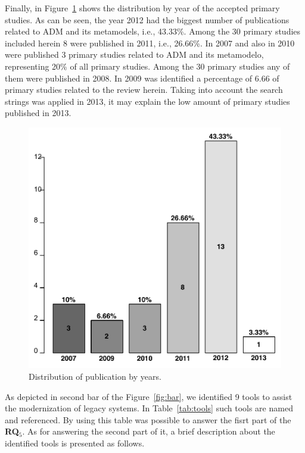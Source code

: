 Finally, in Figure~\ref{fig:distribuicao_de_artigo_por_ano} shows the distribution by year of the accepted primary studies. As can be seen, the year 2012 had the biggest number of publications related to ADM and its metamodels, i.e., 43.33\%. Among the 30 primary studies included herein 8 were published in 2011, i.e., 26.66\%. In 2007 and also in 2010 were published 3 primary studies related to ADM and its metamodelo, representing 20\% of all primary studies. Among the 30 primary studies any of them were published in 2008. In 2009 was identified a percentage of 6.66 of primary studies related to the review herein. Taking into account the search strings was applied in 2013, it may explain the low amount of primary studies published in 2013. 

 \begin{figure}[!h]
 \centering
   \includegraphics[scale=0.35]{figuras/DistribuicaoANoArtigos}
 \caption{Distribution of publication by years.}
 \label{fig:distribuicao_de_artigo_por_ano}
\end{figure} 


As depicted in second bar of the Figure~\ref{fig:bar}, we identified 9 tools to assist the modernization of legacy systems. In Table~\ref{tab:tools} such tools are named and referenced. By using this table was possible to  answer the fisrt part of the \textbf{RQ$_5$}. As for answering the second part of it, a brief description about the identified tools is presented as follows. 


